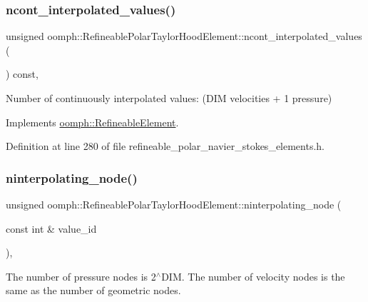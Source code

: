 \subsubsection{\texorpdfstring{ncont\+\_\+interpolated\+\_\+values()}{ncont\_interpolated\_values()}}
{\footnotesize\ttfamily unsigned oomph\+::\+Refineable\+Polar\+Taylor\+Hood\+Element\+::ncont\+\_\+interpolated\+\_\+values (\begin{DoxyParamCaption}{ }\end{DoxyParamCaption}) const\hspace{0.3cm}{\ttfamily [inline]}, {\ttfamily [virtual]}}



Number of continuously interpolated values\+: (D\+IM velocities + 1 pressure) 



Implements \hyperlink{classoomph_1_1RefineableElement_a53e171a18c9f43f1db90a6876516a073}{oomph\+::\+Refineable\+Element}.



Definition at line 280 of file refineable\+\_\+polar\+\_\+navier\+\_\+stokes\+\_\+elements.\+h.

\mbox{\label{classoomph_1_1RefineablePolarTaylorHoodElement_a999bb0fb10a4ebdc446e99bddaf7cdd2}} 
\subsubsection{\texorpdfstring{ninterpolating\+\_\+node()}{ninterpolating\_node()}}
{\footnotesize\ttfamily unsigned oomph\+::\+Refineable\+Polar\+Taylor\+Hood\+Element\+::ninterpolating\+\_\+node (\begin{DoxyParamCaption}\item[{const int \&}]{value\+\_\+id }\end{DoxyParamCaption})\hspace{0.3cm}{\ttfamily [inline]}, {\ttfamily [virtual]}}



The number of pressure nodes is 2$^\wedge$\+D\+IM. The number of velocity nodes is the same as the number of geometric nodes. 



